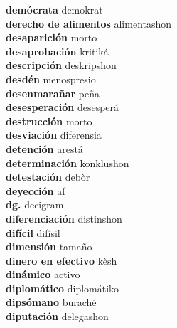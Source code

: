 \textbf{ demócrata  } demokrat \\
\textbf{ derecho de alimentos  } alimentashon \\
\textbf{ desaparición  } morto \\
\textbf{ desaprobación  } kritiká \\
\textbf{ descripción  } deskripshon \\
\textbf{ desdén  } menospresio \\
\textbf{ desenmarañar  } peña \\
\textbf{ desesperación  } desesperá \\
\textbf{ destrucción  } morto \\
\textbf{ desviación  } diferensia \\
\textbf{ detención  } arestá \\
\textbf{ determinación  } konklushon \\
\textbf{ detestación  } debòr \\
\textbf{ deyección  } af \\
\textbf{ dg.  } decigram \\
\textbf{ diferenciación  } distinshon \\
\textbf{ difícil  } difísil \\
\textbf{ dimensión  } tamaño \\
\textbf{ dinero en efectivo  } kèsh \\
\textbf{ dinámico  } activo \\
\textbf{ diplomático  } diplomátiko \\
\textbf{ dipsómano  } buraché \\
\textbf{ diputación  } delegashon \\
